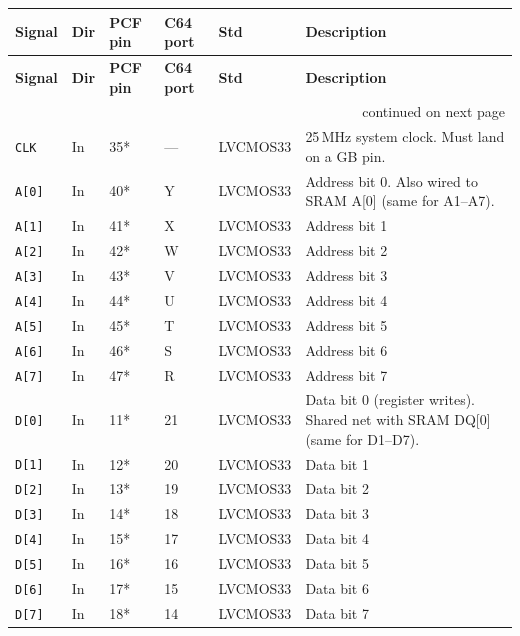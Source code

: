 \documentclass[11pt,a4paper]{article}
\newcommand{\sig}[1]{\texttt{#1}}
\begin{document}
\begin{center}
\small
\begin{longtable}{lllllp{4.6cm}}
\toprule
\textbf{Signal} & \textbf{Dir} & \textbf{PCF pin} & \textbf{C64 port} & \textbf{Std} &
\textbf{Description} \\
\midrule
\endfirsthead
\toprule
\textbf{Signal} & \textbf{Dir} & \textbf{PCF pin} & \textbf{C64 port} & \textbf{Std} &
\textbf{Description} \\
\midrule
\endhead
\midrule
\multicolumn{6}{r}{\small continued on next page}\\
\endfoot
\bottomrule
\endlastfoot

\sig{CLK}      & In  & 35* & --- & LVCMOS33 &
    25\,MHz system clock. Must land on a GB pin. \\[2pt]

\sig{A[0]}     & In  & 40* & Y & LVCMOS33 &
    Address bit 0. Also wired to SRAM A[0] (same for A1--A7). \\
\sig{A[1]}     & In  & 41* & X & LVCMOS33 & Address bit 1 \\
\sig{A[2]}     & In  & 42* & W & LVCMOS33 & Address bit 2 \\
\sig{A[3]}     & In  & 43* & V & LVCMOS33 & Address bit 3 \\
\sig{A[4]}     & In  & 44* & U & LVCMOS33 & Address bit 4 \\
\sig{A[5]}     & In  & 45* & T & LVCMOS33 & Address bit 5 \\
\sig{A[6]}     & In  & 46* & S & LVCMOS33 & Address bit 6 \\
\sig{A[7]}     & In  & 47* & R & LVCMOS33 & Address bit 7 \\[2pt]

\sig{D[0]}     & In  & 11* & 21 & LVCMOS33 &
    Data bit 0 (register writes). Shared net with SRAM DQ[0]
    (same for D1--D7). \\
\sig{D[1]}     & In  & 12* & 20 & LVCMOS33 & Data bit 1 \\
\sig{D[2]}     & In  & 13* & 19 & LVCMOS33 & Data bit 2 \\
\sig{D[3]}     & In  & 14* & 18 & LVCMOS33 & Data bit 3 \\
\sig{D[4]}     & In  & 15* & 17 & LVCMOS33 & Data bit 4 \\
\sig{D[5]}     & In  & 16* & 16 & LVCMOS33 & Data bit 5 \\
\sig{D[6]}     & In  & 17* & 15 & LVCMOS33 & Data bit 6 \\
\sig{D[7]}     & In  & 18* & 14 & LVCMOS33 & Data bit 7 \\[2pt]


\end{longtable}
\end{center}
\end{document}
